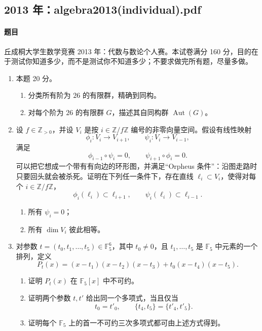 \documentclass[UTF8,12pt]{ctexart}
\begin{document}
\subsection{2013 年：algebra2013(individual).pdf}
\paragraph{题目}
丘成桐大学生数学竞赛 2013 年：代数与数论个人赛。本试卷满分 160 分，目的在于测试你知道多少，而不是测试你不知道多少；不要求做完所有题，尽量多做。
\begin{enumerate}[label=\textbf{\arabic*.},leftmargin=2.2em]
\item 本题 20 分。
\begin{enumerate}[label=\textbf{1.\arabic*},leftmargin=2.4em]
\item 分类所有阶为 \(26\) 的有限群，精确到同构。
\item 对每个阶为 \(26\) 的有限群 \(G\)，描述其自同构群 \(\operatorname{Aut}(G)\)。
\end{enumerate}

\item 设 \(f\in\mathbb Z_{>0}\)，并设 \(V_i\) 是按 \(i\in\mathbb Z/f\mathbb Z\) 编号的非零向量空间。假设有线性映射
\[
\phi_i:V_i\to V_{i+1},\qquad \psi_i:V_i\to V_{i-1},
\]
满足
\[
\phi_{i-1}\circ\psi_i=0,\qquad \psi_{i+1}\circ\phi_i=0.
\]
可以把它想成一个带有有向边的环形图，并满足“Orpheus 条件”：沿图走路时只要回头就会被杀死。证明在下列任一条件下，存在直线 \(\ell_i\subset V_i\)，使得对每个 \(i\in\mathbb Z/f\mathbb Z\)，
\[
\phi_i(\ell_i)\subset\ell_{i+1},\qquad
\psi_i(\ell_i)\subset\ell_{i-1}.
\]
\begin{enumerate}[label=\textbf{2.\arabic*},leftmargin=2.4em]
\item 所有 \(\psi_i=0\)；
\item 所有 \(\dim V_i\) 彼此相等。
\end{enumerate}

\item 对参数 \(t=(t_0,t_1,\ldots,t_5)\in\mathbb F_5^6\)，其中 \(t_0\ne0\)，且 \(t_1,\ldots,t_5\) 是 \(\mathbb F_5\) 中元素的一个排列，定义
\[
P_t(x)=(x-t_1)(x-t_2)(x-t_3)+t_0(x-t_4)(x-t_5).
\]
\begin{enumerate}[label=\textbf{3.\arabic*},leftmargin=2.4em]
\item 证明 \(P_t(x)\) 在 \(\mathbb F_5[x]\) 中不可约。
\item 证明两个参数 \(t,t'\) 给出同一个多项式，当且仅当
\[
t_0=t'_0,\qquad \{t_4,t_5\}=\{t'_4,t'_5\}.
\]
\item 证明每个 \(\mathbb F_5\) 上的首一不可约三次多项式都可由上述方式得到。
\end{enumerate}


\end{enumerate}
\end{document}
